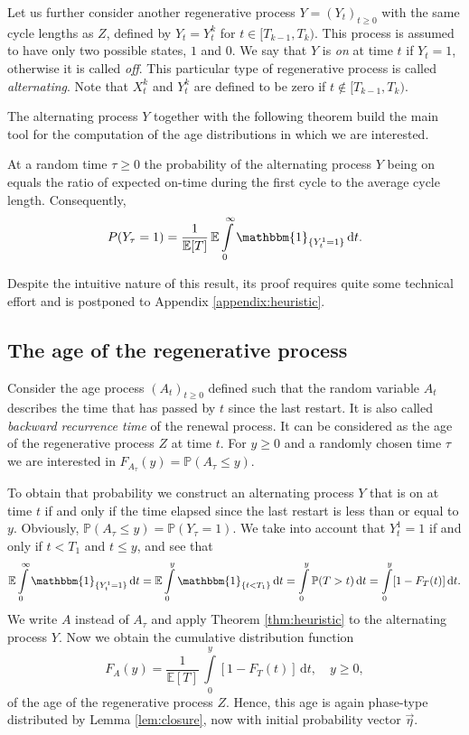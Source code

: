 \documentclass[smallextended]{svjour3}
\renewcommand{\P}{\mathbb{P}}
\newcommand{\E}{\mathbb{E}}
\newcommand{\intl}{\int\limits}
\begin{document}
Let us further consider another regenerative process $Y = (Y_t)_{t\geq0}$ with the same cycle lengths as $Z$, defined by $Y_t = Y^k_t$ for $t\in[T_{k-1},T_k)$.
This process is assumed to have only two possible states, $1$ and $0$.
We say that $Y$ is \emph{on} at time $t$ if $Y_t=1$, otherwise it is called \emph{off}.
This particular type of regenerative process is called \emph{alternating}.
Note that $X^k_t$ and $Y^k_t$ are defined to be zero if $t\notin[T_{k-1},T_k)$.

The alternating process $Y$ together with the following theorem build the main tool for the computation of the age distributions in which we are interested.

\begin{theorem}\label{thm:heuristic}
At a random time $\tau\geq0$ the probability of the alternating process $Y$ being on equals the ratio of expected on-time during the first cycle to the average cycle length. Consequently,
\[
    P(Y_\tau=1) = \frac{1}{\E[T]}\,\E\intl_0^\infty\mathbbm{1}_{\{Y^1_t=1\}}\,\mathrm{d}t.
\]
\end{theorem}

Despite the intuitive nature of this result, its proof requires quite some technical effort and is postponed to Appendix \ref{appendix:heuristic}.

\subsection{The age of the regenerative process\label{sec:sysage}}

Consider the age process $(A_t)_{t\geq0}$ defined such that the random variable $A_t$ describes the time that has passed by $t$ since the last restart.
It is also called \emph{backward recurrence time} of the renewal process.
It can be considered as the age of the regenerative process $Z$ at time $t$.
For $y\geq0$ and a randomly chosen time $\tau$ we are interested in $F_{A_\tau}(y)=\P(A_\tau\leq y)$.

To obtain that probability we construct an alternating process $Y$ that is on at time $t$ if and only if the time elapsed since the last restart is less than or equal to $y$.
Obviously, $\P(A_\tau\leq y) = \P(Y_\tau=1)$.
We take into account that $Y^1_t=1$ if and only if $t<T_1$ and $t\leq y$, and see that
\[
    \E\intl_0^\infty\mathbbm{1}_{\{Y^1_t=1\}}\,\mathrm{d}t = \E\intl_0^y\mathbbm{1}_{\{t<T_1\}}\,\mathrm{d}t = \intl_0^y \P(T>t)\,\mathrm{d}t = \intl_0^y [1-F_T(t)]\,\mathrm{d}t.
\]
We write $A$ instead of $A_\tau$ and apply Theorem \ref{thm:heuristic} to the alternating process $Y$.
Now we obtain the cumulative distribution function
\begin{equation}\label{eqn:agecum}
    F_A(y) = \frac{1}{\E[T]}\,\intl_0^y[1-F_T(t)]\,\mathrm{d}t,\quad y\geq0,
\end{equation}
of the age of the regenerative process $Z$.
Hence, this age is again phase-type distributed by Lemma \ref{lem:closure}, now with initial probability vector $\vec{\eta}$.
\end{document}
